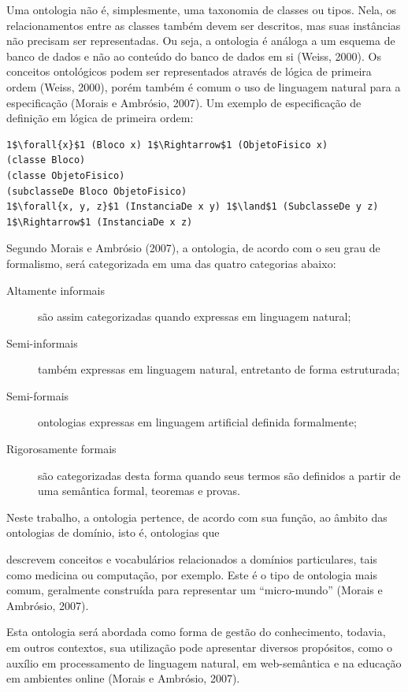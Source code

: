 Uma ontologia não é, simplesmente, uma taxonomia de classes ou tipos. Nela, os relacionamentos entre as classes também devem ser descritos, mas suas instâncias não precisam ser representadas.  Ou seja, a ontologia é análoga a um esquema de banco de dados e não ao conteúdo do banco de dados em si (Weiss, 2000). Os conceitos ontológicos podem ser representados através de lógica de primeira ordem (Weiss, 2000), porém também é comum o uso de linguagem natural para a especificação (Morais e Ambrósio, 2007). Um exemplo de especificação de definição em lógica de primeira ordem:


\vspace{0.4cm}
\begin{lstlisting}[frame=single]
1$\forall{x}$1 (Bloco x) 1$\Rightarrow$1 (ObjetoFisico x)
(classe Bloco)
(classe ObjetoFisico)
(subclasseDe Bloco ObjetoFisico)
1$\forall{x, y, z}$1 (InstanciaDe x y) 1$\land$1 (SubclasseDe y z) 1$\Rightarrow$1 (InstanciaDe x z)
\end{lstlisting}

Segundo Morais e Ambrósio (2007),  a ontologia,  de acordo com o seu grau de formalismo, será categorizada em uma das quatro categorias abaixo:
\begin{description}
    \item [Altamente informais] são assim categorizadas quando expressas em linguagem natural;
    \item [Semi-informais] também expressas em linguagem natural, entretanto de forma estruturada;
    \item [Semi-formais] ontologias expressas em linguagem artificial definida formalmente;
    \item [Rigorosamente formais] são categorizadas desta forma quando seus termos são definidos a partir de uma semântica formal, teoremas e provas.
\end{description}

Neste trabalho, a ontologia pertence, de acordo com sua função, ao âmbito das ontologias de domínio, isto é, ontologias que 
\begin{directcite}
    descrevem conceitos e vocabulários relacionados a domínios particulares, tais como medicina ou computação, por exemplo.  Este é o tipo de ontologia mais comum, geralmente construída para representar um “micro-mundo” (Morais e Ambrósio, 2007).
\end{directcite}Esta ontologia será abordada como forma de gestão do conhecimento, todavia, em outros contextos,  sua utilização pode apresentar diversos propósitos,  como o auxílio em processamento de linguagem natural, em web-semântica e na educação em ambientes online (Morais e Ambrósio, 2007).


